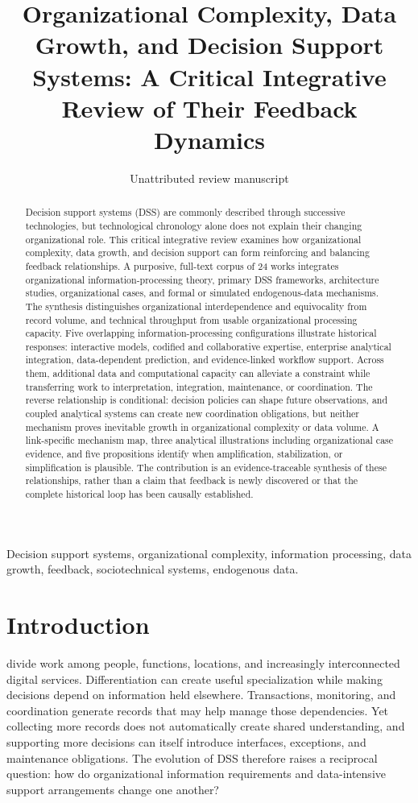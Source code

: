 \documentclass[journal]{IEEEtran}
\title{Organizational Complexity, Data Growth, and Decision Support Systems: A Critical Integrative Review of Their Feedback Dynamics}
\author{Unattributed review manuscript}
\begin{document}
\maketitle
\begin{abstract}
Decision support systems (DSS) are commonly described through successive technologies, but technological chronology alone does not explain their changing organizational role. This critical integrative review examines how organizational complexity, data growth, and decision support can form reinforcing and balancing feedback relationships. A purposive, full-text corpus of 24 works integrates organizational information-processing theory, primary DSS frameworks, architecture studies, organizational cases, and formal or simulated endogenous-data mechanisms. The synthesis distinguishes organizational interdependence and equivocality from record volume, and technical throughput from usable organizational processing capacity. Five overlapping information-processing configurations illustrate historical responses: interactive models, codified and collaborative expertise, enterprise analytical integration, data-dependent prediction, and evidence-linked workflow support. Across them, additional data and computational capacity can alleviate a constraint while transferring work to interpretation, integration, maintenance, or coordination. The reverse relationship is conditional: decision policies can shape future observations, and coupled analytical systems can create new coordination obligations, but neither mechanism proves inevitable growth in organizational complexity or data volume. A link-specific mechanism map, three analytical illustrations including organizational case evidence, and five propositions identify when amplification, stabilization, or simplification is plausible. The contribution is an evidence-traceable synthesis of these relationships, rather than a claim that feedback is newly discovered or that the complete historical loop has been causally established.
\end{abstract}
\begin{IEEEkeywords}
Decision support systems, organizational complexity, information processing, data growth, feedback, sociotechnical systems, endogenous data.
\end{IEEEkeywords}

\section{Introduction}
 divide work among people, functions, locations, and increasingly interconnected digital services. Differentiation can create useful specialization while making decisions depend on information held elsewhere. Transactions, monitoring, and coordination generate records that may help manage those dependencies. Yet collecting more records does not automatically create shared understanding, and supporting more decisions can itself introduce interfaces, exceptions, and maintenance obligations. The evolution of DSS therefore raises a reciprocal question: how do organizational information requirements and data-intensive support arrangements change one another?
\end{document}

